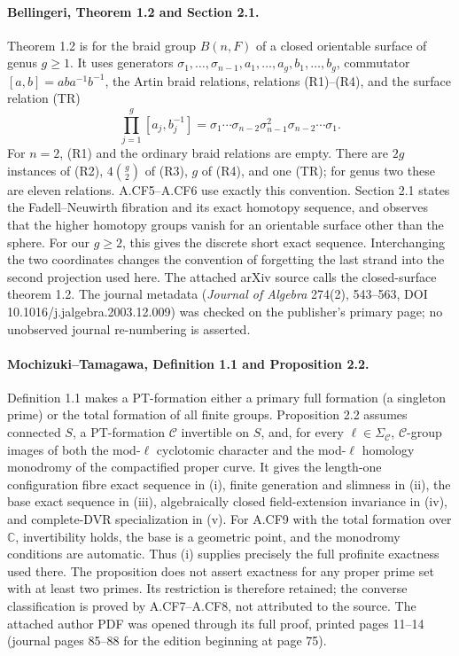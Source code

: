 \paragraph{Bellingeri, Theorem 1.2 and Section 2.1.}
Theorem 1.2 is for the braid group $B(n,F)$ of a closed orientable
surface of genus $g\geq1$. It uses generators
$\sigma_1,\ldots,\sigma_{n-1},a_1,\ldots,a_g,b_1,\ldots,b_g$,
commutator $[a,b]=aba^{-1}b^{-1}$, the Artin braid relations,
relations (R1)--(R4), and the surface relation (TR)
\[
 \prod_{j=1}^g[a_j,b_j^{-1}]
 =\sigma_1\cdots\sigma_{n-2}\sigma_{n-1}^2
   \sigma_{n-2}\cdots\sigma_1.
\]
For $n=2$, (R1) and the ordinary braid relations are empty. There are
$2g$ instances of (R2), $4\binom g2$ of (R3), $g$ of (R4), and
one (TR); for genus two these are eleven relations. A.CF5--A.CF6
use exactly this convention. Section 2.1 states the Fadell--Neuwirth
fibration and its exact homotopy sequence, and observes that the
higher homotopy groups vanish for an orientable surface other than
the sphere. For our $g\geq2$, this gives the discrete short exact
sequence. Interchanging the two coordinates changes the convention
of forgetting the last strand into the second projection used here.
The attached arXiv source calls the closed-surface theorem 1.2.
The journal metadata (\emph{Journal of Algebra} 274(2), 543--563,
DOI 10.1016/j.jalgebra.2003.12.009) was checked on the publisher's
primary page; no unobserved journal re-numbering is asserted.

\paragraph{Mochizuki--Tamagawa, Definition 1.1 and Proposition 2.2.}
Definition 1.1 makes a PT-formation either a primary full formation
(a singleton prime) or the total formation of all finite groups.
Proposition 2.2 assumes connected $S$, a PT-formation $\mathcal C$
invertible on $S$, and, for every $\ell\in\Sigma_{\mathcal C}$,
$\mathcal C$-group images of both the mod-$\ell$ cyclotomic character
and the mod-$\ell$ homology monodromy of the compactified proper
curve. It gives the length-one configuration fibre exact sequence
in (i), finite generation and slimness in (ii), the base exact
sequence in (iii), algebraically closed field-extension invariance
in (iv), and complete-DVR specialization in (v).
For A.CF9 with the total formation over $\mathbb C$, invertibility
holds, the base is a geometric point, and the monodromy conditions
are automatic. Thus (i) supplies precisely the full profinite
exactness used there. The proposition does not assert exactness for
any proper prime set with at least two primes. Its restriction is
therefore retained; the converse classification is proved by
A.CF7--A.CF8, not attributed to the source. The attached author PDF
was opened through its full proof, printed pages 11--14 (journal
pages 85--88 for the edition beginning at page 75).

